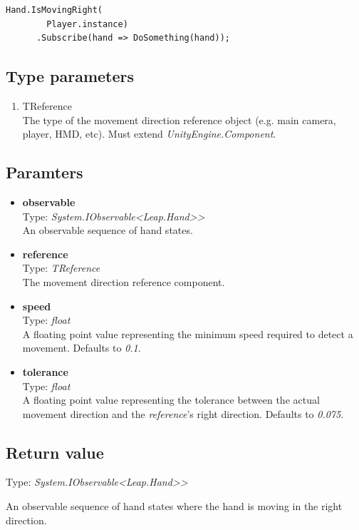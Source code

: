 \documentclass[12pt,a4paper,twoside]{report}
\begin{document}
\begin{lstlisting}[caption=Usage example]
  Hand.IsMovingRight(
        Player.instance)
      .Subscribe(hand => DoSomething(hand));
\end{lstlisting}

\subsection{Type parameters}
\begin{enumerate}
  \item TReference\\
    The type of the movement direction reference object (e.g. main camera, player, HMD, etc). Must extend \textit{UnityEngine.Component}.
\end{enumerate}

\subsection{Paramters}
\begin{itemize}
  \item \textbf{observable} \\
    Type: \textit{System.IObservable<Leap.Hand>{}>}\\
    An observable sequence of hand states.
  \item \textbf{reference} \\
    Type: \textit{TReference}\\
    The movement direction reference component.
  \item \textbf{speed}\\
    Type: \textit{float}\\
    A floating point value representing the minimum speed required to detect a movement. Defaults to \textit{0.1}.
  \item \textbf{tolerance}\\
    Type: \textit{float}\\
    A floating point value representing the tolerance between the actual movement direction and the \textit{reference}'s right direction. Defaults to \textit{0.075}.
\end{itemize}

\subsection{Return value}
Type: \textit{System.IObservable<Leap.Hand>{}>}

An observable sequence of hand states where the hand is moving in the right direction.
\end{document}
